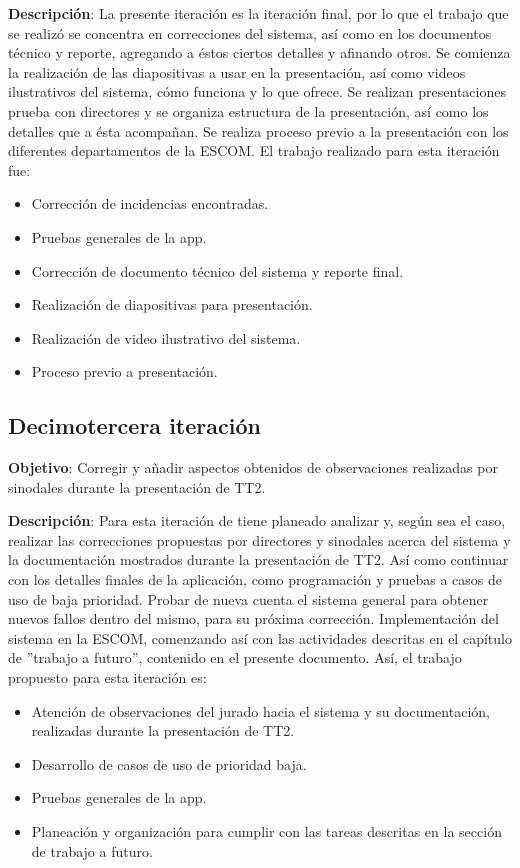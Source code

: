 \noindent
\textbf{Descripción}: La presente iteración es la iteración final, por lo que el trabajo que se realizó se concentra en correcciones del sistema, así como en los documentos técnico y reporte, agregando a éstos ciertos detalles y afinando otros. Se comienza la realización de las diapositivas a usar en la presentación, así como videos ilustrativos del sistema, cómo funciona y lo que ofrece. Se realizan presentaciones prueba con directores y se organiza estructura de la presentación, así como los detalles que a ésta acompañan.
Se realiza proceso previo a la presentación con los diferentes departamentos de la ESCOM. 
\newline
El trabajo realizado para esta iteración fue:
\begin{itemize}
	\item Corrección de incidencias encontradas.
	\item Pruebas generales de la app. 
	\item Corrección de documento técnico del sistema y reporte final.
	\item Realización de diapositivas para presentación.
	\item Realización de video ilustrativo del sistema.
	\item Proceso previo a presentación.
\end{itemize}


\subsection{Decimotercera iteración} 

\noindent
\textbf{Objetivo}: Corregir y añadir aspectos obtenidos de observaciones realizadas por sinodales durante la presentación de TT2.
\newline

\noindent
\textbf{Descripción}: Para esta iteración de tiene planeado analizar y, según sea el caso, realizar las correcciones propuestas por directores y sinodales acerca del sistema y la documentación mostrados durante la presentación de TT2. Así como continuar con los detalles finales de la aplicación, como programación y pruebas a casos de uso de baja prioridad. Probar de nueva cuenta el sistema general para obtener nuevos fallos dentro del mismo, para su próxima corrección. Implementación del sistema en la ESCOM, comenzando así con las actividades descritas en el capítulo de ''trabajo a futuro'', contenido en el presente documento. 
\newline
Así, el trabajo propuesto para esta iteración es:
\begin{itemize}
	\item Atención de observaciones del jurado hacia el sistema y su documentación, realizadas durante la presentación de TT2.
	\item Desarrollo de casos de uso de prioridad baja.
	\item Pruebas generales de la app. 
	\item Planeación y organización para cumplir con las tareas descritas en la sección de trabajo a futuro.
\end{itemize}


